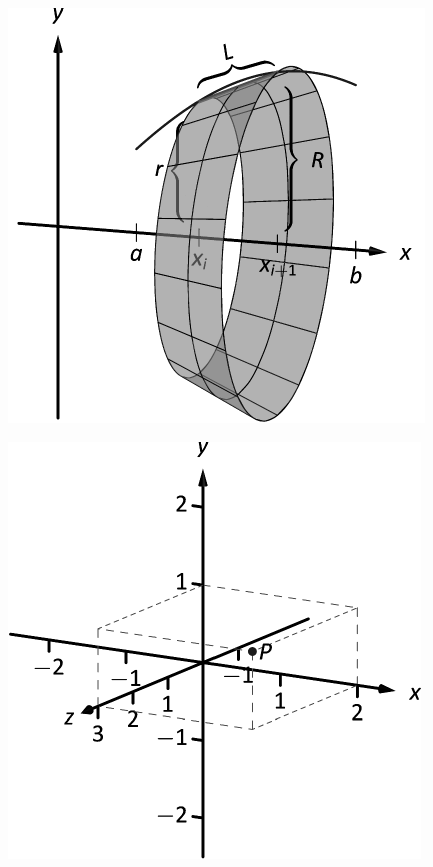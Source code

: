 \documentclass[10pt]{article}
\begin{document}
\includegraphics{figarc4_3DBW.pdf}
\texttt{}

\includegraphics{figcartcoord1_3DBW.pdf}
\texttt{}
\end{document}
